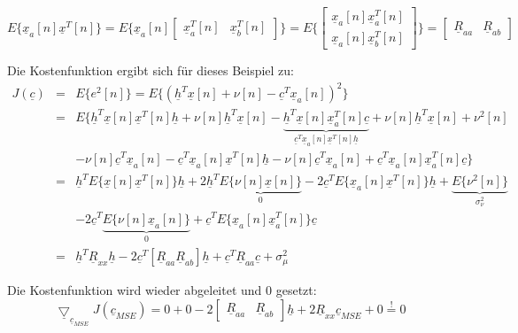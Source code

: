 \begin{equation}
 E\{\underline{x}_a[n] \underline{x}^T[n]\} = E\{\underline{x}_a[n] \begin{bmatrix} \underline{x}_a^T[n] & \underline{x}_b^T[n] \end{bmatrix}\} = E\{\begin{bmatrix} \underline{x}_a[n] \underline{x}_a^T[n] \\ \underline{x}_a[n] \underline{x}_b^T[n] \end{bmatrix}\} = \begin{bmatrix} \underline{R}_{aa} & \underline{R}_{ab} \end{bmatrix}
\end{equation}


Die Kostenfunktion ergibt sich für dieses Beispiel zu:
\begin{eqnarray}
 J(\underline{c}) & = & E\{e^2[n]\} = E\{(\underline{h}^T \underline{x}[n] + \nu [n] - \underline{c}^T \underline{x}_a[n])^2\} \\
 & = & E\{\underline{h}^T \underline{x}[n] \underline{x}^T[n] \underline{h} + \nu [n] \underline{h}^T \underline{x}[n] - \underbrace{\underline{h}^T \underline{x}[n] \underline{x}_a^T[n] \underline{c}}_{\underline{c}^T \underline{x}_a[n] \underline{x}^T[n] \underline{h}} + \nu [n] \underline{h}^T \underline{x}[n] + \nu^2[n] \\
 & & - \nu [n] \underline{c}^T \underline{x}_a[n] - \underline{c}^T \underline{x}_a[n] \underline{x}^T[n] \underline{h} - \nu [n] \underline{c}^T \underline{x}_a[n] + \underline{c}^T \underline{x}_a[n] \underline{x}_a^T[n] \underline{c}\} \\
 & = & \underline{h}^T E\{\underline{x}[n] \underline{x}^T[n]\} \underline{h} + 2 \underline{h}^T \underbrace{E\{\nu [n] \underline{x}[n]\}}_{0} - 2 \underline{c}^T E\{\underline{x}_a[n] \underline{x}^T[n]\} \underline{h} + \underbrace{E\{\nu^2[n]\}}_{\sigma_\nu^2} \\
 & & - 2 \underline{c}^T \underbrace{E\{\nu [n] \underline{x}_a[n]\}}_{0} + \underline{c}^T E\{\underline{x}_a[n] \underline{x}_a^T[n]\} \underline{c} \\
 & = & \underline{h}^T \underline{R}_{xx} \underline{h} - 2 \underline{c}^T [ \underline{R}_{aa} \underline{R}_{ab} ] \underline{h} + \underline{c}^T \underline{R}_{aa} \underline{c} + \sigma_\mu^2
\end{eqnarray}

Die Kostenfunktion wird wieder abgeleitet und 0 gesetzt:
\begin{equation}
 \underline{\bigtriangledown}_{\underline{c}_{MSE}} J(\underline{c}_{MSE}) = 0 + 0 - 2 \begin{bmatrix} \underline{R}_{aa} & \underline{R}_{ab} \end{bmatrix} \underline{h} + 2 \underline{R}_{xx} \underline{c}_{MSE} + 0 \stackrel{!}{=} 0
\end{equation}

